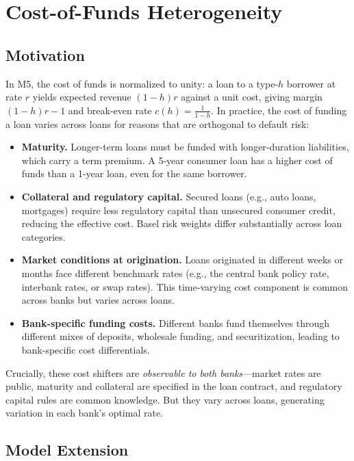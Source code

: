 \documentclass[12pt]{article}
\theoremstyle{plain}
\theoremstyle{plain}
\theoremstyle{definition}  %
\theoremstyle{remark}  %
\begin{document}
\section{Cost-of-Funds Heterogeneity}\label{sec:cost}

\subsection{Motivation}

In M5, the cost of funds is normalized to unity: a loan to a type-$h$ borrower at rate $r$ yields expected revenue $(1-h)r$ against a unit cost, giving margin $(1-h)r - 1$ and break-even rate $c(h) = \frac{1}{1-h}$. In practice, the cost of funding a loan varies across loans for reasons that are orthogonal to default risk:

\begin{itemize}
    \item \textbf{Maturity.} Longer-term loans must be funded with longer-duration liabilities, which carry a term premium. A 5-year consumer loan has a higher cost of funds than a 1-year loan, even for the same borrower.
    \item \textbf{Collateral and regulatory capital.} Secured loans (e.g., auto loans, mortgages) require less regulatory capital than unsecured consumer credit, reducing the effective cost. Basel risk weights differ substantially across loan categories.
    \item \textbf{Market conditions at origination.} Loans originated in different weeks or months face different benchmark rates (e.g., the central bank policy rate, interbank rates, or swap rates). This time-varying cost component is common across banks but varies across loans.
    \item \textbf{Bank-specific funding costs.} Different banks fund themselves through different mixes of deposits, wholesale funding, and securitization, leading to bank-specific cost differentials.
\end{itemize}

\noindent
Crucially, these cost shifters are \emph{observable to both banks}---market rates are public, maturity and collateral are specified in the loan contract, and regulatory capital rules are common knowledge. But they vary across loans, generating variation in each bank's optimal rate.

\subsection{Model Extension}
\end{document}
